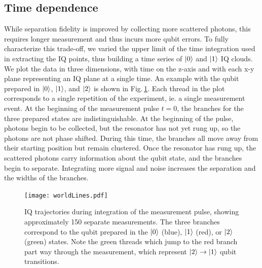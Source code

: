 \subsection{Time dependence}

While separation fidelity is improved by collecting more scattered photons, this requires longer measurement and thus incurs more qubit errors.
To fully characterize this trade-off, we varied the upper limit of the time integration used in extracting the IQ points, thus building a time series of $|0\rangle$ and $|1\rangle$ IQ clouds.
We plot the data in three dimensions, with time on the z-axis and with each x-y plane representing an IQ plane at a single time.
An example with the qubit prepared in $|0\rangle$, $|1\rangle$, and $|2\rangle$ is shown in Fig.\,\ref{Fig:ch:results:sec:timeDependence:worldLines}.
Each thread in the plot corresponds to a single repetition of the experiment, ie. a single measurement event.
At the beginning of the measurement pulse $t=0$, the branches for the three prepared states are indistinguishable.
At the beginning of the pulse, photons begin to be collected, but the resonator has not yet rung up, so the photons are not phase shifted.
During this time, the branches all move away from their starting position but remain clustered.
Once the resonator has rung up, the scattered photons carry information about the qubit state, and the branches begin to separate.
Integrating more signal and noise increases the separation and the widths of the branches.

\begin{figure}
\begin{centering}
\texttt{[image: worldLines.pdf]}
\par\end{centering}
\caption{IQ trajectories during integration of the measurement pulse, showing approximately 150 separate measurements.
The three branches correspond to the qubit prepared in the $|0\rangle$ (blue), $|1\rangle$ (red), or $|2\rangle$ (green) states.
Note the green threads which jump to the red branch part way through the measurement, which represent $|2\rangle\rightarrow|1\rangle$ qubit transitions.}
\label{Fig:ch:results:sec:timeDependence:worldLines}
\end{figure}

